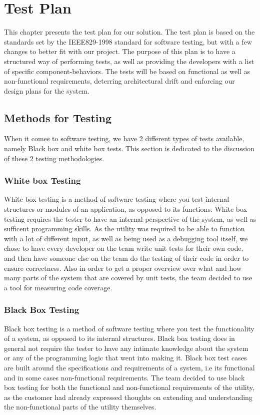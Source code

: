 \chapter{Test Plan}
This chapter presents the test plan for our solution. The test plan is based on
the standards set by the IEEE829-1998 standard for software testing, but with a
few changes to better fit with our project. The purpose of this plan is to have
a structured way of performing tests, as well as providing the developers with
a list of specific component-behaviors. The tests will be based on functional as
well as non-functional requirements, deterring architectural drift and
enforcing our design plans for the system.


\section{Methods for Testing}
When it comes to software testing, we have 2 different types of tests available, namely Black box and white box tests. This section is dedicated to the discussion of these 2 testing methodologies.


\subsection{White box Testing}
White box testing is a method of software testing where you test internal structures or modules of an application, as opposed to its functions. White box testing requires the tester to have an internal perspective of the system, as well as sufficent programming skills. As the \gls{utility} was required to be able to function with a lot of different input, as well as being used as a debugging tool itself, we chose to have every developer on the team write unit tests for their own code, and then have someone else on the team do the testing of their code in order to ensure correctness. Also in order to get a proper overview over what and how many parts of the system that are covered by unit tests, the team decided to use a tool for measuring code coverage.


\subsection{Black Box Testing}
Black box testing is a method of software testing where you test the functionality of a system, as opposed to its internal structures. Black box testing does in general not require the tester to have any intimate knowledge about the system or any of the programming logic that went into making it. Black box test cases are built around the specifications and requirements of a system, i.e its functional and in some cases non-functional requirements. The team decided to use black box testing for both the functional and non-functional requirements of the \gls{utility}, as the customer had already expressed thoughts on extending and understanding the non-functional parts of the \gls{utility} themselves. 


